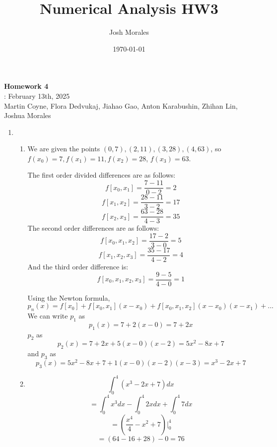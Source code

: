 \documentclass[12pt]{article}
\title{Numerical Analysis HW3}
\author{Josh Morales}
\date{\today}
\begin{document}
\pagestyle{fancy}
\begin{center}
\textbf{\Large Homework 4} \\
: February 13th, 2025\\
Martin Coyne, Flora Dedvukaj, Jiahao Gao, Anton Karabushin, Zhihan Lin, Joshua Morales
\end{center}
\begin{enumerate}[leftmargin=2em]
    \item
    \begin{enumerate}
        \item
        We are given the points $(0,7), (2,11), (3,28), (4, 63)$, so $f(x_0) = 7, f(x_1)=11, f(x_2)=28$, $f(x_3)=63$.
        
        The first order divided differences are as follows:
        \[f[x_0, x_1] = \frac{7-11}{0-2} = 2\]
        \[f[x_1, x_2] = \frac{28-11}{3-2} = 17\]
        \[f[x_2, x_3] = \frac{63-28}{4-3} = 35\]
        The second order differences are as follows:
        \[f[x_0, x_1, x_2] = \frac{17-2}{3-0} = 5\]
        \[f[x_1, x_2, x_3] = \frac{35-17}{4-2} = 4\]
        And the third order difference is:
        \[f[x_0, x_1, x_2, x_3] = \frac{9-5}{4-0} = 1\]

        Using the Newton formula,
        \[p_n(x)=f[x_0]+f[x_0,x_1](x-x_0) + f[x_0, x_1, x_2](x-x_0)(x-x_1)+...\]
        We can write $p_1$ as
        \[p_1(x) = 7+2(x-0) = 7+2x\]
        $p_2$ as
        \[p_2(x) = 7+2x+5(x-0)(x-2) = 5x^2-8x+7\]
        and $p_3$ as
        \[p_3(x) = 5x^2-8x+7+1(x-0)(x-2)(x-3) = x^3-2x+7\]

        \item 
        \[ \int_{0}^{4}(x^3-2x+7)dx \]
        \[ = \int_{0}^{4}x^3dx - \int_{0}^{4}2xdx + \int_{0}^{4}7dx\]
        \[ = (\frac{x^4}{4} - x^2 + 7)\vert_{0}^{4}\]
        \[ = (64 - 16 + 28) - 0 = 76\]
    \end{enumerate}


\end{enumerate}
\end{document}
